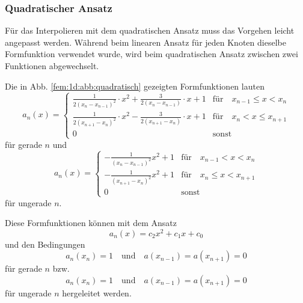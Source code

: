 \subsubsection{Quadratischer Ansatz}
Für das Interpolieren mit dem quadratischen Ansatz muss das Vorgehen leicht angepasst werden. 
Während beim linearen Ansatz für jeden Knoten dieselbe Formfunktion verwendet wurde, wird beim quadratischen Ansatz zwischen zwei Funktionen abgewechselt.

Die in Abb. \ref{fem:1d:abb:quadratisch} gezeigten Formfunktionen lauten
\begin{equation}
    a_n(x) = \left\{ \begin{array}{ll}
        \frac{1}{2(x_{n} - x_{n-1})^2} \cdot x^2 + \frac{3}{2 (x_{n} - x_{n-1})} \cdot x + 1  
            & \text{für} \quad x_{n-1} \leq x < x_n \\
        \frac{1}{2(x_{n+1} - x_{n})^2} \cdot x^2 - \frac{3}{2 (x_{n+1} - x_{n})} \cdot x + 1
            & \text{für} \quad x_n < x \leq x_{n+1} \\
        0
            & \text{sonst}
    \end{array} \right.
\end{equation}
für gerade $n$ und
\begin{equation}
    a_n(x) = \left\{ \begin{array}{ll}
        -\frac{1}{(x_n - x_{n-1})^2} x^2 + 1 
            & \text{für} \quad x_{n-1} < x < x_n \\
        -\frac{1}{(x_{n+1} - x_n)^2} x^2 + 1 
            & \text{für} \quad x_n \leq x < x_{n+1} \\
        0 
            & \text{sonst}
    \end{array} \right.
\end{equation}
für ungerade $n$.

Diese Formfunktionen können mit dem Ansatz 
\begin{equation}
    a_n(x) = c_2x^2 + c_1x + c_0
\end{equation}
und den Bedingungen 
\begin{equation}
        a_n(x_n) = 1 
        \quad \text{und} \quad 
        a(x_{n-1}) = a(x_{n+1}) = 0
\end{equation}
für gerade $n$ bzw.
\begin{equation}
        a_n(x_n) = 1 
        \quad \text{und} \quad
        a(x_{n-1}) = a(x_{n+1}) = 0
\end{equation}
für ungerade $n$ hergeleitet werden.

